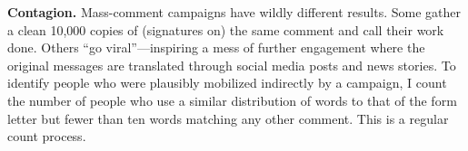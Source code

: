 \textbf{Contagion.} Mass-comment campaigns have wildly different results. Some gather a clean 10,000 copies of (signatures on) the same comment and call their work done. Others ``go viral''---inspiring a mess of further engagement where the original messages are translated through social media posts and news stories.
To identify people who were plausibly mobilized indirectly by a campaign, I count the number of people who use a similar distribution of words to that of the form letter but fewer than ten words matching any other comment. This is a regular count process.


















